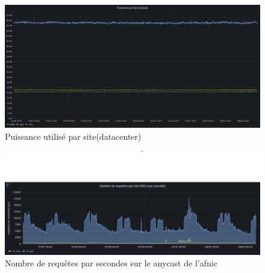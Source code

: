 \pagebreak
\appendix


\begin{figure}[!htbp]
    \centering
      \includegraphics[width=\textwidth]{paper/figures/puissanceParSite.png}
      \caption{Puissance utilisé par site(datacenter)}
    \label{A:puissanceParSite}
\end{figure}



\begin{figure}[!htbp]
    \centering
      \includegraphics[width=\textwidth]{paper/figures/qpsAnycast.png}
      \caption{Nombre de requêtes par secondes sur le \gls{anycast} de l'afnic}
      \label{A:QPSAnycast}
\end{figure}